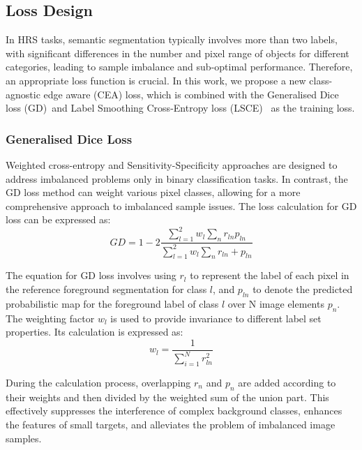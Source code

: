 \documentclass[journal]{IEEEtran}
\begin{document}
\subsection{Loss Design}
In HRS tasks, semantic segmentation typically involves more than two labels, with significant differences in the number and pixel range of objects for different categories, leading to sample imbalance and sub-optimal performance. Therefore, an appropriate loss function is crucial. In this work, we propose a new class-agnostic edge aware (CEA) loss, which is combined with the Generalised Dice loss (GD)~\cite{sudre2017generalised}and Label Smoothing Cross-Entropy loss (LSCE)~\cite{muller2019does} as the training loss.

\subsubsection{Generalised Dice Loss}
Weighted cross-entropy and Sensitivity-Specificity approaches are designed to address imbalanced problems only in binary classification tasks. In contrast, the GD loss method can weight various pixel classes, allowing for a more comprehensive approach to imbalanced sample issues. The loss calculation for GD loss can be expressed as:
\begin{equation}
GD = 1 - 2\frac{\sum_{l=1}^2w_l\sum_{n}r_{ln}p_{ln}}{\sum_{l=1}^2w_l\sum_{n}r_{ln} + p_{ln}}
\end{equation}


The equation for GD loss involves using $r_{l}$ to represent the label of each pixel in the reference foreground segmentation for class $l$, and $p_{ln}$ to denote the predicted probabilistic map for the foreground label of class $l$ over N image elements $p_{n}$. The weighting factor $w_{l}$ is used to provide invariance to different label set properties. Its calculation is expressed as:
\begin{equation}
w_l = \frac{1}{\sum_{i=1}^Nr_{ln}^2}
\end{equation}

During the calculation process, overlapping $r_{n}$ and $p_{n}$ are added according to their weights and then divided by the weighted sum of the union part. This effectively suppresses the interference of complex background classes, enhances the features of small targets, and alleviates the problem of imbalanced image samples.
\end{document}
